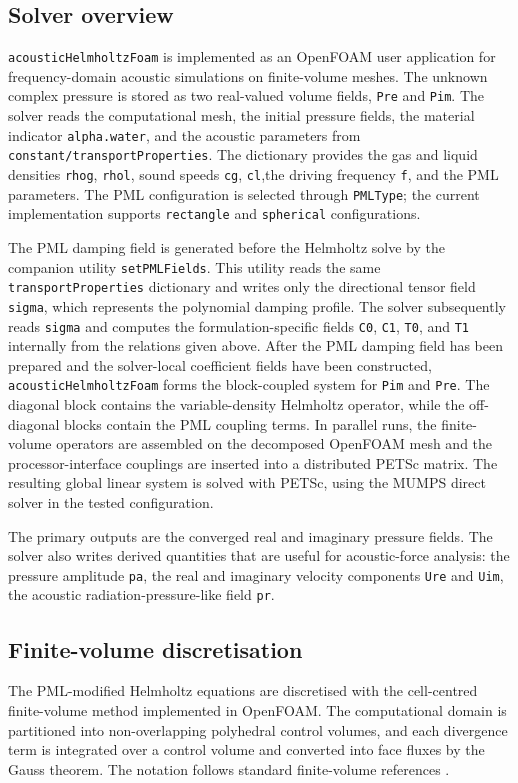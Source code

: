 \documentclass[final,num,12pt]{elsarticle}
\begin{document}
\subsection{Solver overview}
\label{sec:solverOverview}
\texttt{acousticHelmholtzFoam} is implemented as an OpenFOAM user application for
frequency-domain acoustic simulations on finite-volume meshes.  The unknown
complex pressure is stored as two real-valued volume fields, \texttt{Pre} and
\texttt{Pim}.  The solver reads the computational mesh, the initial pressure
fields, the material indicator \texttt{alpha.water}, and the acoustic parameters
from \texttt{constant/transportProperties}.  The dictionary provides the gas and
liquid densities \texttt{rhog}, \texttt{rhol}, sound speeds \texttt{cg},
\texttt{cl},the
driving frequency \texttt{f}, and the PML parameters.  The PML configuration is
selected through \texttt{PMLType}; the current implementation supports
\texttt{rectangle} and \texttt{spherical} configurations.

The PML damping field is generated before the Helmholtz solve by the companion
utility \texttt{setPMLFields}.  This utility reads the same
\texttt{transportProperties} dictionary and writes only the directional tensor
field \texttt{sigma}, which represents the polynomial damping profile.  The
solver subsequently reads \texttt{sigma} and computes the formulation-specific
fields \texttt{C0}, \texttt{C1}, \texttt{T0}, and \texttt{T1} internally from
the relations given above.  
After the PML damping field has been prepared and the solver-local coefficient
fields have been constructed, \texttt{acousticHelmholtzFoam} forms the
block-coupled system for \texttt{Pim} and \texttt{Pre}.  The diagonal block
contains the variable-density Helmholtz operator, while the off-diagonal blocks
contain the PML coupling terms.  In parallel runs, the finite-volume operators
are assembled on the decomposed OpenFOAM mesh and the processor-interface
couplings are inserted into a distributed PETSc matrix.  The resulting global
linear system is solved with PETSc, using the MUMPS direct solver in the tested
configuration.

The primary outputs are the converged real and imaginary pressure fields.  The
solver also writes derived quantities that are useful for acoustic-force
analysis: the pressure amplitude \texttt{pa}, the real and imaginary velocity
components \texttt{Ure} and \texttt{Uim}, the acoustic radiation-pressure-like
field \texttt{pr}.

\subsection{Finite-volume discretisation}
\label{sec:fvmDiscretisation}
The PML-modified Helmholtz equations are discretised with the cell-centred
finite-volume method implemented in OpenFOAM.  The computational domain is
partitioned into non-overlapping polyhedral control volumes, and each
divergence term is integrated over a control volume and converted into face
fluxes by the Gauss theorem.  The notation follows standard finite-volume
references \cite{Versteeg2007,Ferziger2020}.
\end{document}
